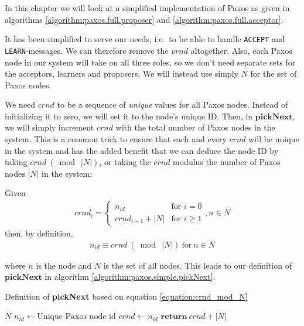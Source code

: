 In this chapter we will look at a simplified implementation of Paxos as
given in algorithms \ref{algorithm:paxos.full.proposer} and
\ref{algorithm:paxos.full.acceptor}.

It has been simplified to serve our needs, i.e.~to be able to handle
\texttt{ACCEPT} and \texttt{LEARN}-messages.  We can therefore remove the
$vrnd$ altogether.  Also, each Paxos node in our system will take on all
three roles, so we don't need separate sets for the acceptors, learners and
proposers. We will instead use simply $N$ for the set of Paxos nodes.

We need $crnd$ to be a sequence of \textit{unique} values for all Paxos
nodes.
Instead of initializing it to zero, we will set it to the node's
unique ID.  Then, in $\textbf{pickNext}$, we will simply increment $crnd$
with the total number of Paxos nodes in the system.  This
is a common trick to ensure that each and every $crnd$ will be unique in the
system and has
the added benefit that we can deduce the node ID by taking
$crnd\ (\bmod\ |N|)$, or taking the $crnd$ modulus the number of Paxos nodes
$|N|$ in the system:

Given
\begin{gather}
  crnd_i = \left\{
             \begin{array}{ll}
               n_{id} & \mbox{for } i = 0 \\
               crnd_{i-1} + |N| & \mbox{for } i \geq 1
             \end{array}
           \right. , n \in N
  \label{equation:crnd_i}
\end{gather}
then, by definition,
\begin{gather}
  n_{id} \equiv crnd\ (\bmod\ |N|)\ \text{for}\ n \in N
  \label{equation:crnd_mod_N}
\end{gather}

where $n$ is the node and $N$ is the set of all nodes.  This leads to our
definition of $\textbf{pickNext}$ in algorithm
\ref{algorithm:paxos.simple.pickNext}.

\begin{algorithm}
  \caption{Definition of \textbf{pickNext} based on equation \ref{equation:crnd_mod_N}}
  \label{algorithm:paxos.simple.pickNext}
  \begin{algorithmic}
    \State $N$ 
    \State $n_{id} \gets \text{Unique Paxos node id}$
    \State $crnd \gets n_{id}$ 
    \State
      \State $\textbf{return}\ crnd + |N|$ 
    \EndFunction
  \end{algorithmic}
\end{algorithm}

